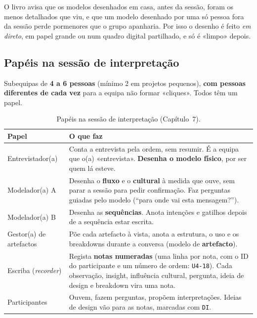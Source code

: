 \documentclass[11pt,a4paper]{article}
\begin{document}
\begin{nota}
O livro avisa que os modelos desenhados em casa, antes da sessão, foram os menos detalhados que viu, e que um modelo desenhado por uma só pessoa fora da sessão perde pormenores que o grupo apanharia. Por isso o desenho é feito \emph{em direto}, em papel grande ou num quadro digital partilhado, e só é «limpo» depois.
\end{nota}

\subsection{Papéis na sessão de interpretação}

Subequipas de \textbf{4 a 6 pessoas} (mínimo 2 em projetos pequenos), \textbf{com pessoas diferentes de cada vez} para a equipa não formar «cliques». Todos têm um papel.

\begin{table}[h]
\centering\small
\begin{tabularx}{\textwidth}{@{}p{3.3cm}L@{}}
\toprule
\textbf{Papel} & \textbf{O que faz} \\
\midrule
Entrevistador(a) & Conta a entrevista pela ordem, sem resumir. É a equipa que o(a) «entrevista». \textbf{Desenha o modelo físico}, por ser quem lá esteve. \\
Modelador(a) A & Desenha o \textbf{fluxo} e o \textbf{cultural} à medida que ouve, sem parar a sessão para pedir confirmação. Faz perguntas guiadas pelo modelo (``para onde vai esta mensagem?''). \\
Modelador(a) B & Desenha as \textbf{sequências}. Anota intenções e gatilhos depois de a sequência estar escrita. \\
Gestor(a) de artefactos & Põe cada artefacto à vista, anota a estrutura, o uso e os breakdowns durante a conversa (modelo de \textbf{artefacto}). \\
Escriba (\textit{recorder}) & Regista \textbf{notas numeradas} (uma linha por nota, com o ID do participante e um número de ordem: \texttt{U4-18}). Cada observação, insight, influência cultural, pergunta, ideia de design e breakdown vira uma nota. \\
Participantes & Ouvem, fazem perguntas, propõem interpretações. Ideias de design vão para as notas, marcadas com \texttt{DI}. \\
\bottomrule
\end{tabularx}
\caption{Papéis na sessão de interpretação (Capítulo~7).}
\end{table}
\end{document}
